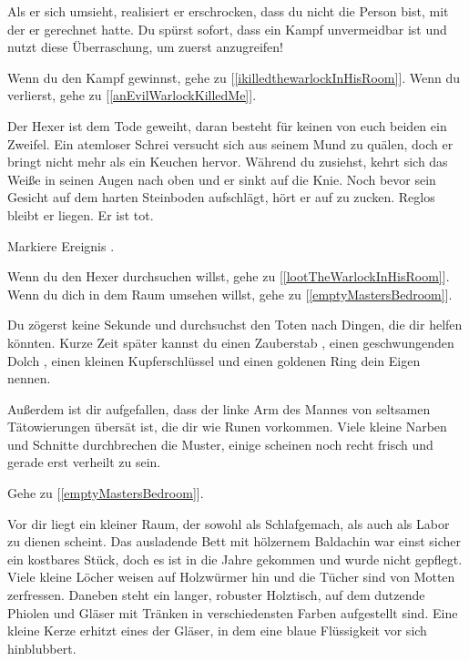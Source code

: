 Als er sich umsieht, realisiert er erschrocken, dass du nicht die Person bist, mit der er gerechnet hatte. Du spürst sofort, dass ein Kampf unvermeidbar ist und nutzt diese Überraschung, um zuerst anzugreifen!

\monsterWarlock

Wenn du den Kampf gewinnst, gehe zu [\ref{ikilledthewarlockInHisRoom}].
Wenn du verlierst, gehe zu [\ref{anEvilWarlockKilledMe}].


Der Hexer ist dem Tode geweiht, daran besteht für keinen von euch beiden ein Zweifel. Ein atemloser Schrei versucht sich aus seinem Mund zu quälen, doch er bringt nicht mehr als ein Keuchen hervor. Während du zusiehst, kehrt sich das Weiße in seinen Augen nach oben und er sinkt auf die Knie. Noch bevor sein Gesicht auf dem harten Steinboden aufschlägt, hört er auf zu zucken. Reglos bleibt er liegen. Er ist tot.

Markiere Ereignis .

Wenn du den Hexer durchsuchen willst, gehe zu [\ref{lootTheWarlockInHisRoom}].
Wenn du dich in dem Raum umsehen willst, gehe zu [\ref{emptyMastersBedroom}].


Du zögerst keine Sekunde und durchsuchst den Toten nach Dingen, die dir helfen könnten.
Kurze Zeit später kannst du einen Zauberstab , einen geschwungenden Dolch , einen kleinen Kupferschlüssel  und einen goldenen Ring  dein Eigen nennen.

Außerdem ist dir aufgefallen, dass der linke Arm des Mannes von seltsamen Tätowierungen übersät ist, die dir wie Runen vorkommen. Viele kleine Narben und Schnitte durchbrechen die Muster, einige scheinen noch recht frisch und gerade erst verheilt zu sein.

Gehe zu [\ref{emptyMastersBedroom}].


Vor dir liegt ein kleiner Raum, der sowohl als Schlafgemach, als auch als Labor zu dienen scheint.
Das ausladende Bett mit hölzernem Baldachin war einst sicher ein kostbares Stück, doch es ist in die Jahre gekommen und wurde nicht gepflegt. Viele kleine Löcher weisen auf Holzwürmer hin und die Tücher sind von Motten zerfressen. Daneben steht ein langer, robuster Holztisch, auf dem dutzende Phiolen und Gläser mit Tränken in verschiedensten Farben aufgestellt sind. Eine kleine Kerze erhitzt eines der Gläser, in dem eine blaue Flüssigkeit vor sich hinblubbert.

